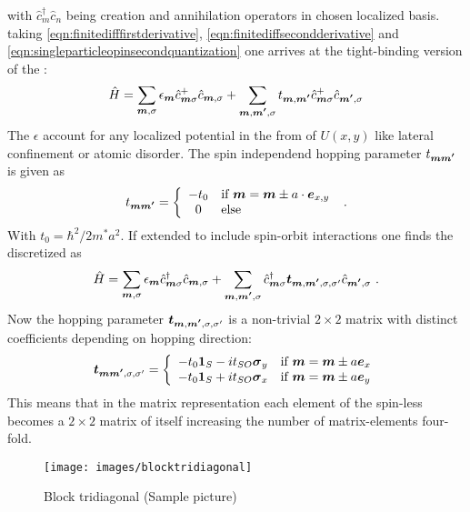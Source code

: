 with $\hat{c}^{\dagger}_m \hat{c}_n $ being creation and annihilation operators in chosen localized basis.
taking \ref{eqn:finitedifffirstderivative}, \ref{eqn:finitediffsecondderivative} and \ref{eqn:singleparticleopinsecondquantization} one arrives at the tight-binding version of the \hamil{}:
\begin{align}
	\hat{H} = \sum_{\boldsymbol{m},\sigma} \epsilon_{\boldsymbol{m}} \hat{c}^+_{\boldsymbol{m}\sigma} \hat{c}_{\boldsymbol{m},\sigma} +
	\sum_{\boldsymbol{m},\boldsymbol{m'},\sigma} t_{\boldsymbol{m},\boldsymbol{m'}} \hat{c}^+_{\boldsymbol{m}\sigma} \hat{c}_{\boldsymbol{m'},\sigma}
	\label{eqn:discretizedeffectivemassHamil}
\end{align}
The $\epsilon$ account for any localized potential in the from of $U(x,y)$ like lateral confinement or atomic disorder.
The spin independend hopping parameter $t_{\boldsymbol{m}\boldsymbol{m'}}$ is given as
\begin{align}
t_{\boldsymbol{m}\boldsymbol{m'}} = \left\{ \begin{array}[c]{cl} -t_0 & \text{if } \boldsymbol{m} = \boldsymbol{m} \pm a \cdot \boldsymbol{e}_{x,y} \\ 0 & \text{else} \end{array} \right.\ .
	\label{eqn:t0hopping}
\end{align}
With $t_0 = \hbar^2/2m^*a^2$. If extended to include spin-orbit interactions one finds the discretized \rash{} \hamil{} as
\begin{align}
	\hat{H} = \sum_{\boldsymbol{m},\sigma} \epsilon_{\boldsymbol{m}} \hat{c}^{\dagger}_{\boldsymbol{m}\sigma} \hat{c}_{\boldsymbol{m},\sigma} +
	\sum_{\boldsymbol{m},\boldsymbol{m'},\sigma}  \hat{c}^{\dagger}_{\boldsymbol{m}\sigma} \boldsymbol{t}_{\boldsymbol{m},\boldsymbol{m'},\sigma,\sigma '} \hat{c}_{\boldsymbol{m'},\sigma}\ .
	\label{eqn:discretizedrashbahamil}
\end{align}
Now the hopping parameter $\boldsymbol{t}_{\boldsymbol{m},\boldsymbol{m'},\sigma,\sigma '}$ is a non-trivial $2 \times 2$ matrix with distinct coefficients depending on hopping direction:
\begin{align}
	\boldsymbol{t}_{\boldsymbol{m}\boldsymbol{m'},\sigma,\sigma '} = \left\{ \begin{array}[c]{cl} -t_0\boldsymbol{1}_S - i t_{SO} \boldsymbol{\sigma}_y & \text{if } \boldsymbol{m} = \boldsymbol{m} \pm a \boldsymbol{e}_{x} \\
		-t_0\boldsymbol{1}_S + i t_{SO} \boldsymbol{\sigma}_x & \text{if } \boldsymbol{m} = \boldsymbol{m} \pm a \boldsymbol{e}_{y} \end{array} \right. 
	\label{eqn:tsohopping}
\end{align}
This means that in the matrix representation each element of the spin-less \hamil{} becomes a $2 \times 2$ matrix of itself increasing the number of matrix-elements four-fold.
\begin{figure}[h!]
\centering
\texttt{[image: images/blocktridiagonal]}
\caption{Block tridiagonal (Sample picture)}
\label{fig:blocktridiagonal}
\end{figure}

